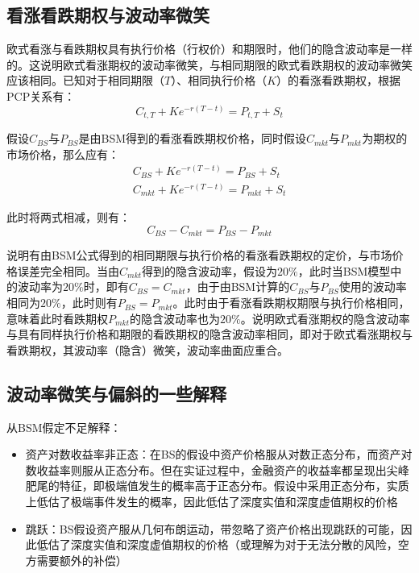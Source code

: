 \documentclass[11pt]{article}
\begin{document}
\subsection{看涨看跌期权与波动率微笑}

欧式看涨与看跌期权具有执行价格（行权价）和期限时，他们的隐含波动率是一样的。这说明欧式看涨期权的波动率微笑，与相同期限的欧式看跌期权的波动率微笑应该相同。已知对于相同期限（$T$）、相同执行价格（$K$）的看涨看跌期权，根据PCP关系有：
\begin{equation*}
    C_{t,T} + Ke^{-r(T-t)} = P_{t,T} + S_t
\end{equation*}

假设$C_{BS}$与$P_{BS}$是由BSM得到的看涨看跌期权价格，同时假设$C_{mkt}$与$P_{mkt}$为期权的市场价格，那么应有：
\begin{align*}
    C_{BS} + Ke^{-r(T-t)} = P_{BS} + S_t \\
    C_{mkt} + Ke^{-r(T-t)} = P_{mkt} + S_t
\end{align*}

此时将两式相减，则有：
\begin{equation*}
    C_{BS} - C_{mkt} = P_{BS} - P_{mkt}
\end{equation*}

说明有由BSM公式得到的相同期限与执行价格的看涨看跌期权的定价，与市场价格误差完全相同。当由$C_{mkt}$得到的隐含波动率，假设为$20\%$，此时当BSM模型中的波动率为$20\%$时，即有$C_{BS} = C_{mkt}$，由于由BSM计算的$C_{BS}$与$P_{BS}$使用的波动率相同为$20\%$，此时则有$P_{BS} = P_{mkt}$。此时由于看涨看跌期权期限与执行价格相同，意味着此时看跌期权$P_{mkt}$的隐含波动率也为$20\%$。说明欧式看涨期权的隐含波动率与具有同样执行价格和期限的看跌期权的隐含波动率相同，即对于欧式看涨期权与看跌期权，其波动率（隐含）微笑，波动率曲面应重合。

\subsection{波动率微笑与偏斜的一些解释}

从BSM假定不足解释：
\begin{itemize}
    \item 资产对数收益率非正态：在BS的假设中资产价格服从对数正态分布，而资产对数收益率则服从正态分布。但在实证过程中，金融资产的收益率都呈现出尖峰肥尾的特征，即极端值发生的概率高于正态分布。假设中采用正态分布，实质上低估了极端事件发生的概率，因此低估了深度实值和深度虚值期权的价格
    \item 跳跃：BS假设资产服从几何布朗运动，带忽略了资产价格出现跳跃的可能，因此低估了深度实值和深度虚值期权的价格（或理解为对于无法分散的风险，空方需要额外的补偿）
\end{itemize}
\end{document}
